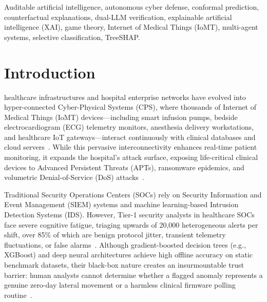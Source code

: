 \documentclass{ieeeaccess}
\begin{document}
\begin{keywords}
Auditable artificial intelligence, autonomous cyber defense, conformal prediction, counterfactual explanations, dual-LLM verification, explainable artificial intelligence (XAI), game theory, Internet of Medical Things (IoMT), multi-agent systems, selective classification, TreeSHAP.
\end{keywords}

\titlepgskip=-15pt
\maketitle

\section{Introduction}
\label{sec:introduction}
 healthcare infrastructures and hospital enterprise networks have evolved into hyper-connected Cyber-Physical Systems (CPS), where thousands of Internet of Medical Things (IoMT) devices---including smart infusion pumps, bedside electrocardiogram (ECG) telemetry monitors, anesthesia delivery workstations, and healthcare IoT gateways---interact continuously with clinical databases and cloud servers~\cite{dadkhah2024ciciomt2024, sun2022cyber, al2020survey}. While this pervasive interconnectivity enhances real-time patient monitoring, it expands the hospital's attack surface, exposing life-critical clinical devices to Advanced Persistent Threats (APTs), ransomware epidemics, and volumetric Denial-of-Service (DoS) attacks~\cite{vielberth2020security, ahmad2021soc}.

Traditional Security Operations Centers (SOCs) rely on Security Information and Event Management (SIEM) systems and machine learning-based Intrusion Detection Systems (IDS). However, Tier-1 security analysts in healthcare SOCs face severe cognitive fatigue, triaging upwards of 20,000 heterogeneous alerts per shift, over 85\% of which are benign protocol jitter, transient telemetry fluctuations, or false alarms~\cite{ahmad2021soc, sarhan2023towards}. Although gradient-boosted decision trees (e.g., XGBoost) and deep neural architectures achieve high offline accuracy on static benchmark datasets, their black-box nature creates an insurmountable trust barrier: human analysts cannot determine whether a flagged anomaly represents a genuine zero-day lateral movement or a harmless clinical firmware polling routine~\cite{marcus2020next, lundberg2017unified, ribeiro2016should}.
\end{document}
